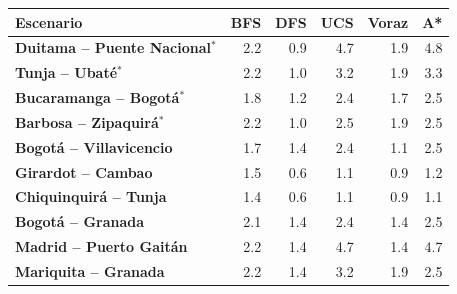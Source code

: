\renewcommand{\arraystretch}{1.2}
\begin{tabular}{|l|r|r|r|r|r|}
\hline
\rowcolor{gray!20} \textbf{Escenario} & \textbf{BFS} & \textbf{DFS} & \textbf{UCS} & \textbf{Voraz} & \textbf{A*} \\
\hline
\textbf{Duitama -- Puente Nacional$^{*}$} & 2.2 & 0.9 & 4.7 & 1.9 & 4.8 \\
\hline
\textbf{Tunja -- Ubaté$^{*}$} & 2.2 & 1.0 & 3.2 & 1.9 & 3.3 \\
\hline
\textbf{Bucaramanga -- Bogotá$^{*}$} & 1.8 & 1.2 & 2.4 & 1.7 & 2.5 \\
\hline
\textbf{Barbosa -- Zipaquirá$^{*}$} & 2.2 & 1.0 & 2.5 & 1.9 & 2.5 \\
\hline
\textbf{Bogotá -- Villavicencio} & 1.7 & 1.4 & 2.4 & 1.1 & 2.5 \\
\hline
\textbf{Girardot -- Cambao} & 1.5 & 0.6 & 1.1 & 0.9 & 1.2 \\
\hline
\textbf{Chiquinquirá -- Tunja} & 1.4 & 0.6 & 1.1 & 0.9 & 1.1 \\
\hline
\textbf{Bogotá -- Granada} & 2.1 & 1.4 & 2.4 & 1.4 & 2.5 \\
\hline
\textbf{Madrid -- Puerto Gaitán} & 2.2 & 1.4 & 4.7 & 1.4 & 4.7 \\
\hline
\textbf{Mariquita -- Granada} & 2.2 & 1.4 & 3.2 & 1.9 & 2.5 \\
\hline
\end{tabular}
